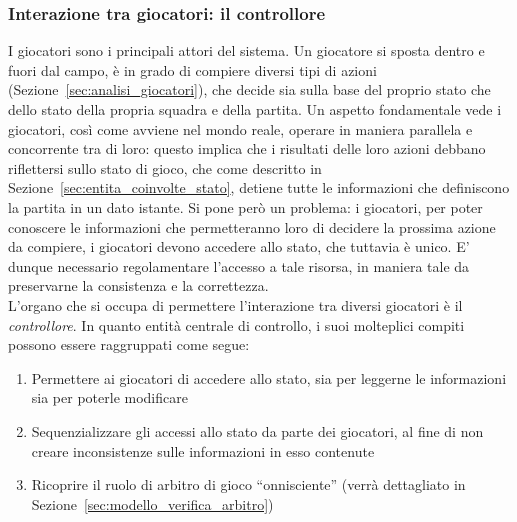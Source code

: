 
%

\subsubsection{Interazione tra giocatori: il controllore}
\label{sec:modello_interazione_giocatori}

I giocatori sono i principali attori del sistema. Un giocatore si sposta dentro e fuori dal campo, è in grado di compiere diversi tipi di azioni (Sezione~\ref{sec:analisi_giocatori}), che decide sia sulla base del proprio stato che dello stato della propria squadra e della partita. Un aspetto fondamentale vede i giocatori, così come avviene nel mondo reale, operare in maniera parallela e concorrente tra di loro: questo implica che i risultati delle loro azioni debbano riflettersi sullo stato di gioco, che come descritto in Sezione~\ref{sec:entita_coinvolte_stato}, detiene tutte le informazioni che definiscono la partita in un dato istante. Si pone però un problema: i giocatori, per poter conoscere le informazioni che permetteranno loro di decidere la prossima azione da compiere, i giocatori devono accedere allo stato, che tuttavia è unico. E' dunque necessario regolamentare l'accesso a tale risorsa, in maniera tale da preservarne la consistenza e la correttezza.\\

L'organo che si occupa di permettere l'interazione tra diversi giocatori è il \textit{controllore}. In quanto entità centrale di controllo, i suoi molteplici compiti possono essere raggruppati come segue:

\begin{enumerate}
	\item Permettere ai giocatori di accedere allo stato, sia per leggerne le informazioni sia per poterle modificare
	\item Sequenzializzare gli accessi allo stato da parte dei giocatori, al fine di non creare inconsistenze sulle informazioni in esso contenute
	\item Ricoprire il ruolo di arbitro di gioco ``onnisciente'' (verrà dettagliato in Sezione~\ref{sec:modello_verifica_arbitro})
\end{enumerate}

